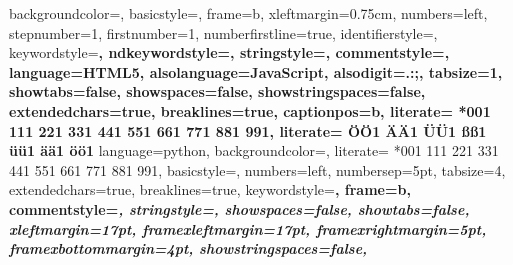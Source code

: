  {%
    backgroundcolor=\color{white},
    basicstyle={\footnotesize\ttfamily},
    frame=b,
    xleftmargin={0.75cm},
    numbers=left,
    stepnumber=1,
    firstnumber=1,
    numberfirstline=true,
    identifierstyle=\color{black},
    keywordstyle=\color{blue}\bfseries,
    ndkeywordstyle=\color{black}\bfseries,
    stringstyle=\color{red}\ttfamily,
    commentstyle=\color{atomComment}\ttfamily,
    language=HTML5,
    alsolanguage=JavaScript,
    alsodigit={.:;},
    tabsize=1,
    showtabs=false,
    showspaces=false,
    showstringspaces=false,
    extendedchars=true,
    breaklines=true,
    captionpos=b,                    %
    literate=%
    *{0}{{{\color{red}0}}}1
    {1}{{{\color{red}1}}}1
    {2}{{{\color{red}2}}}1
    {3}{{{\color{red}3}}}1
    {4}{{{\color{red}4}}}1
    {5}{{{\color{red}5}}}1
    {6}{{{\color{red}6}}}1
    {7}{{{\color{red}7}}}1
    {8}{{{\color{red}8}}}1
    {9}{{{\color{red}9}}}1,
    literate=%
    {Ö}{{\"O}}1
    {Ä}{{\"A}}1
    {Ü}{{\"U}}1
    {ß}{{\ss}}1
    {ü}{{\"u}}1
    {ä}{{\"a}}1
    {ö}{{\"o}}1
}
%
 {%
    language=python,
    backgroundcolor=\color{white},
    literate=%
    *{0}{{{\color{red}0}}}1
    {1}{{{\color{red}1}}}1
    {2}{{{\color{red}2}}}1
    {3}{{{\color{red}3}}}1
    {4}{{{\color{red}4}}}1
    {5}{{{\color{red}5}}}1
    {6}{{{\color{red}6}}}1
    {7}{{{\color{red}7}}}1
    {8}{{{\color{red}8}}}1
    {9}{{{\color{red}9}}}1,
    basicstyle=\footnotesize\ttfamily, %
    numbers=left,               %
    numbersep=5pt,              %
    tabsize=4,                  %
    extendedchars=true,         %
    breaklines=true,            %
    keywordstyle=\color{blue}\bfseries,
    frame=b,
    commentstyle=\color{atomComment}\itshape,
    stringstyle=\color{red}\ttfamily, %
    showspaces=false,           %
    showtabs=false,             %
    xleftmargin=17pt,
    framexleftmargin=17pt,
    framexrightmargin=5pt,
    framexbottommargin=4pt,
    showstringspaces=false,      %
}

